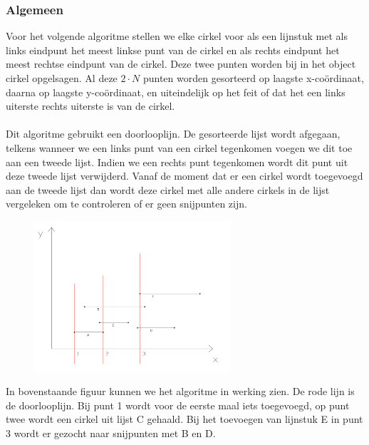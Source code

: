 \documentclass[11pt,a4paper]{article}
\begin{document}
\subsubsection{Algemeen}
Voor het volgende algoritme stellen we elke cirkel voor als een lijnstuk met als links eindpunt het meest linkse punt van de cirkel en als rechts eindpunt het meest rechtse eindpunt van de cirkel. Deze twee punten worden bij in het object cirkel opgelsagen. Al deze $2\cdot N$ punten worden gesorteerd op laagste x-coördinaat, daarna op laagste y-coördinaat, en uiteindelijk op het feit of dat het een links uiterste rechts uiterste is van de cirkel.
\\
\\
Dit algoritme gebruikt een doorlooplijn. De gesorteerde lijst wordt afgegaan, telkens wanneer we een links punt van een cirkel tegenkomen voegen we dit toe aan een tweede lijst. Indien we een rechts punt tegenkomen wordt dit punt uit deze tweede lijst verwijderd. Vanaf de moment dat er een cirkel wordt toegevoegd aan de tweede lijst dan wordt deze cirkel met alle andere cirkels in de lijst vergeleken om te controleren of er geen snijpunten zijn.

\begin{figure}[H]
\centering
\includegraphics[width=0.65\textwidth]{algo2.png}
\end{figure}
In bovenstaande figuur kunnen we het algoritme in werking zien. De rode lijn is de doorlooplijn. Bij punt 1 wordt voor de eerste maal iets toegevoegd, op punt twee wordt een cirkel uit lijst C gehaald. Bij het toevoegen van lijnstuk E in punt 3 wordt er gezocht naar snijpunten met B en D.
\end{document}
